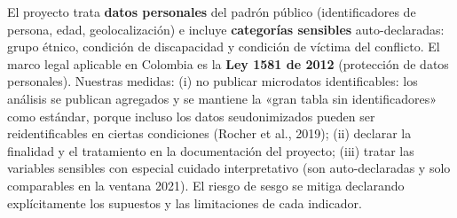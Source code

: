 El proyecto trata \textbf{datos personales} del padrón público (identificadores
de persona, edad, geolocalización) e incluye \textbf{categorías sensibles}
auto-declaradas: grupo étnico, condición de discapacidad y condición de
víctima del conflicto. El marco legal aplicable en Colombia es la
\textbf{Ley 1581 de 2012} (protección de datos personales). Nuestras medidas:
(i) no publicar microdatos identificables: los análisis se publican agregados y
se mantiene la «gran tabla sin identificadores» como estándar, porque incluso
los datos seudonimizados pueden ser reidentificables en ciertas condiciones
(Rocher et al., 2019); (ii) declarar la finalidad y el tratamiento en la
documentación del proyecto; (iii) tratar las
variables sensibles con especial cuidado interpretativo (son auto-declaradas y
solo comparables en la ventana 2021). El riesgo de sesgo se mitiga declarando
explícitamente los supuestos y las limitaciones de cada indicador.

